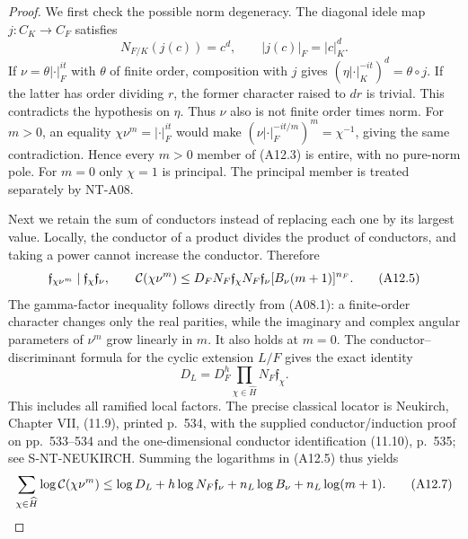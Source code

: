 \begin{proof}
We first check the possible norm degeneracy. The diagonal idele
map \(j:C_K\longrightarrow C_F\) satisfies
\[
 N_{F/K}(j(c))=c^d,\qquad |j(c)|_F=|c|_K^d.
\]
If \(\nu=\theta|\cdot|_F^{it}\) with \(\theta\) of finite order,
composition with \(j\) gives
\((\eta|\cdot|_K^{-it})^d=\theta\circ j\).
If the latter has order dividing \(r\), the former character
raised to \(dr\) is trivial. This contradicts the hypothesis on
\(\eta\). Thus \(\nu\) also is not finite order times norm.
For \(m>0\), an equality
\(\chi\nu^m=|\cdot|_F^{it}\) would make
\((\nu|\cdot|_F^{-it/m})^m=\chi^{-1}\), giving the same
contradiction. Hence every \(m>0\) member of (A12.3) is entire,
with no pure-norm pole. For \(m=0\) only \(\chi=1\) is principal.
The principal member is treated separately by NT-A08.

Next we retain the sum of conductors instead of replacing each
one by its largest value. Locally, the conductor of a product
divides the product of conductors, and taking a power cannot
increase the conductor. Therefore
\[
 \mathfrak f_{\chi\nu^m}\mid\mathfrak f_\chi\mathfrak f_\nu,
 \qquad
 {\cal C}(\chi\nu^m)
   \le D_F N_F\mathfrak f_\chi N_F\mathfrak f_\nu
                       [B_\nu(m+1)]^{n_F}.               \tag{A12.5}
\]
The gamma-factor inequality follows directly from (A08.1):
a finite-order character changes only the real parities, while
the imaginary and complex angular parameters of \(\nu^m\)
grow linearly in \(m\). It also holds at \(m=0\).
The conductor--discriminant formula for the cyclic extension
\(L/F\) gives the exact identity
\[
       D_L=D_F^h\prod_{\chi\in\widehat H}
                                      N_F\mathfrak f_\chi .
                                                               \tag{A12.6}
\]
This includes all ramified local factors. The precise classical
locator is Neukirch, Chapter VII, (11.9), printed p.~534,
with the supplied conductor/induction proof on pp.~533--534
and the one-dimensional conductor identification (11.10),
p.~535; see S-NT-NEUKIRCH. Summing the logarithms in (A12.5)
thus yields
\[
 \sum_{\chi\in\widehat H}\log{\cal C}(\chi\nu^m)
 \le \log D_L+h\log N_F\mathfrak f_\nu
          +n_L\log B_\nu+n_L\log(m+1).                 \tag{A12.7}
\]


\end{proof}
